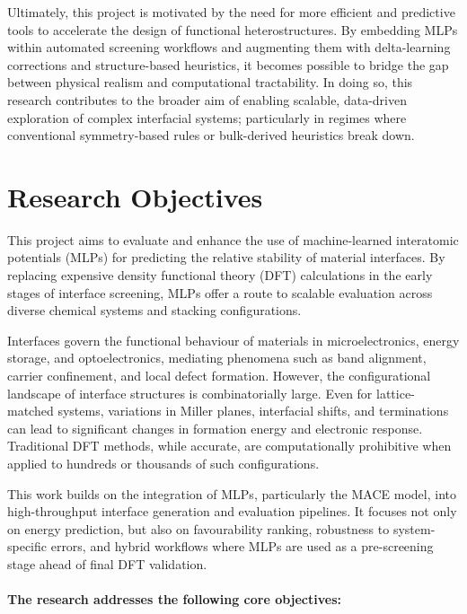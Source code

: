 Ultimately, this project is motivated by the need for more efficient and predictive tools to accelerate the design of functional heterostructures. By embedding MLPs within automated screening workflows and augmenting them with delta-learning corrections and structure-based heuristics, it becomes possible to bridge the gap between physical realism and computational tractability. In doing so, this research contributes to the broader aim of enabling scalable, data-driven exploration of complex interfacial systems; particularly in regimes where conventional symmetry-based rules or bulk-derived heuristics break down. 

\section{Research Objectives} \label{section:research_objectives} 

This project aims to evaluate and enhance the use of machine-learned interatomic potentials (MLPs) for predicting the relative stability of material interfaces. By replacing expensive density functional theory (DFT) calculations in the early stages of interface screening, MLPs offer a route to scalable evaluation across diverse chemical systems and stacking configurations. 

Interfaces govern the functional behaviour of materials in microelectronics, energy storage, and optoelectronics, mediating phenomena such as band alignment, carrier confinement, and local defect formation. However, the configurational landscape of interface structures is combinatorially large. Even for lattice-matched systems, variations in Miller planes, interfacial shifts, and terminations can lead to significant changes in formation energy and electronic response. Traditional DFT methods, while accurate, are computationally prohibitive when applied to hundreds or thousands of such configurations. 

This work builds on the integration of MLPs, particularly the MACE model, into high-throughput interface generation and evaluation pipelines. It focuses not only on energy prediction, but also on favourability ranking, robustness to system-specific errors, and hybrid workflows where MLPs are used as a pre-screening stage ahead of final DFT validation. 

\paragraph{The research addresses the following core objectives:} 

